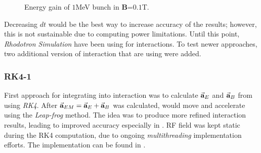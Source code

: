 \documentclass[a4paper,oneside,12pt]{report}
\numberwithin{equation}{chapter}
\begin{document}
\begin{figure}
    \centering
    \vspace{15pt}
    \vspace{15pt}
    \caption{Energy gain of $1$MeV bunch in \textbf{B}=$0.1$T.}
    \label{fig:mag_lf_render}
\end{figure}
Decreasing $dt$ would be the best way to increase accuracy of the results; however, this is not sustainable due to computing power limitations. 
Until this point, \textit{Rhodotron Simulation} have been using  for \eEM interactions. 
To test newer approaches, two additional version of  \eEM interaction that are using  were added.
\subsubsection{RK4-1}
First approach for integrating  into \eEM interaction was to calculate $\vec{\textbf{a}}_{E}$ and $\vec{\textbf{a}}_{B}$ from  using \textit{RK4}.
After $\vec{\textbf{a}}_{EM} = \vec{\textbf{a}}_{E} + \vec{\textbf{a}}_{B}$ was calculated, \e would move and accelerate using the \textit{Leap-frog} method. 
The idea was to produce more refined interaction results, leading to improved accuracy especially in \eB.
RF field was kept static during the RK4 computation, due to ongoing \textit{multithreading} implementation efforts. 
The implementation can be found in .
\end{document}
